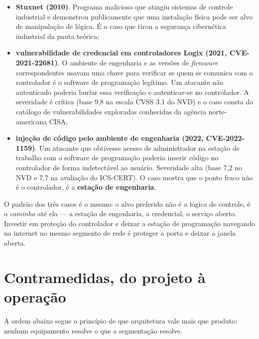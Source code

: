 \begin{itemize}
  \item \textbf{Stuxnet (2010)}. Programa malicioso que atingiu sistemas de controle industrial e
        demonstrou publicamente que uma instalação física pode ser alvo de manipulação de lógica. É o
        caso que tirou a segurança cibernética industrial da pauta teórica;
  \item \textbf{vulnerabilidade de credencial em controladores Logix (2021, CVE-2021-22681)}. O
        ambiente de engenharia e as versões de \emph{firmware} correspondentes usavam uma chave para
        verificar se quem se comunica com o controlador é o software de programação legítimo. Um
        atacante não autenticado poderia burlar essa verificação e autenticar-se no controlador. A
        severidade é crítica (base 9,8 na escala CVSS 3.1 do NVD) e o caso consta do catálogo de
        vulnerabilidades exploradas conhecidas da agência norte-americana CISA;
  \item \textbf{injeção de código pelo ambiente de engenharia (2022, CVE-2022-1159)}. Um atacante que
        obtivesse acesso de administrador na estação de trabalho com o software de programação poderia
        inserir código no controlador de forma indetectável ao usuário. Severidade alta (base 7,2 no
        NVD e 7,7 na avaliação do ICS-CERT). O caso mostra que o ponto fraco não é o controlador, é a
        \textbf{estação de engenharia}.
\end{itemize}

\begin{atencao}
O padrão dos três casos é o mesmo: o alvo preferido não é a lógica de controle, é o \emph{caminho}
até ela --- a estação de engenharia, a credencial, o serviço aberto. Investir em proteção do
controlador e deixar a estação de programação navegando na internet no mesmo segmento de rede é
proteger a porta e deixar a janela aberta.
\end{atencao}

\section{Contramedidas, do projeto à operação}

A ordem abaixo segue o princípio de que arquitetura vale mais que produto: nenhum equipamento resolve
o que a segmentação resolve.

